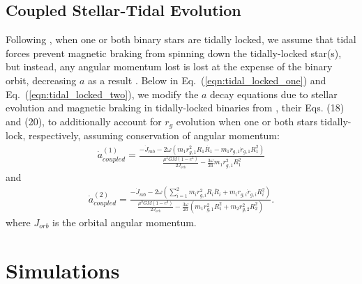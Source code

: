 \documentclass[twocolumn]{aastex61}
\begin{document}
\subsection{Coupled Stellar-Tidal Evolution} \label{sec:coupled}

Following \citet{Fleming2018}, when one or both binary stars are tidally locked, we assume that tidal forces prevent magnetic braking from spinning down the tidally-locked star(s), but instead, any angular momentum lost is lost at the expense of the binary orbit, decreasing $a$ as a result \citep{Verbunt1981}.  Below in Eq.~(\ref{eqn:tidal_locked_one}) and Eq.~(\ref{eqn:tidal_locked_two}), we modify the $a$ decay equations due to stellar evolution and magnetic braking in tidally-locked binaries from \citet{Fleming2018}, their Eqs. (18) and (20), to additionally account for $r_g$ evolution when one or both stars tidally-lock, respectively, assuming conservation of angular momentum:
\small
\begin{equation} \label{eqn:tidal_locked_one}
\begin{split}
\dot{a}_{coupled}^{(1)} = \frac{-\dot{J}_{mb} - 2 \omega \left( m_1 r_{g,1}^2 R_1 \dot{R_1} - m_1 r_{g,1} \dot{r}_{g,1} R_1^2 \right)}
{\frac{\mu^2 G M (1-e^2)}{2J_{orb}} - \frac{3 \omega}{2a} m_1 r_{g,1}^2 R_1^2}
\end{split}
\end{equation}
\normalsize
and
\small
\begin{equation} \label{eqn:tidal_locked_two}
\begin{split}
\dot{a}_{coupled}^{(2)} = \frac{-\dot{J}_{mb} - 2 \omega \left( \sum_{i=1}^{2} m_i r_{g,i}^2 R_i \dot{R_i} + m_i r_{g,i} \dot{r}_{g,i} R_i^2 \right)}
{\frac{\mu^2 G M (1-e^2)}{2J_{orb}} - \frac{3 \omega}{2a} \left( m_1 r_{g,1}^2 R_1^2 + m_2 r_{g,2}^2 R_2^2 \right)}.
\end{split}
\end{equation}
\normalsize
where $J_{orb}$ is the orbital angular momentum.

\section{Simulations} \label{sec:simulations}
\end{document}
